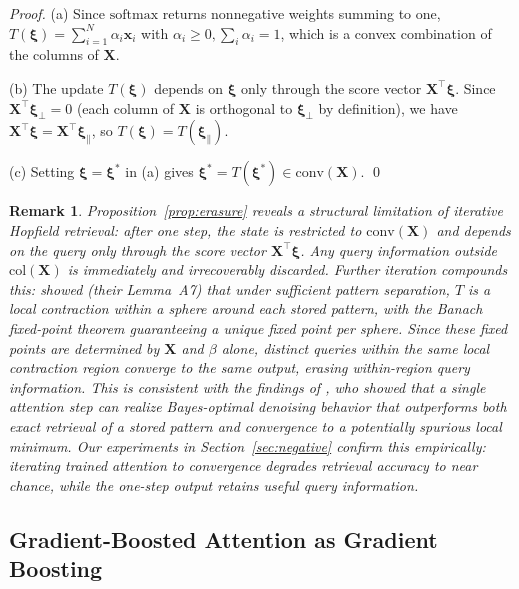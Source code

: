 \documentclass{article}
\newtheorem{remark}{Remark}
\theoremstyle{definition}
\begin{document}
\begin{proof}
(a) Since $\mathrm{softmax}$ returns nonnegative weights summing to one, $T(\boldsymbol{\xi}) = \sum_{i=1}^N \alpha_i \mathbf{x}_i$ with $\alpha_i \geq 0, \sum_i \alpha_i = 1$, which is a convex combination of the columns of $\mathbf{X}$.

(b) The update $T(\boldsymbol{\xi})$ depends on $\boldsymbol{\xi}$ only through the score vector $\mathbf{X}^\top \boldsymbol{\xi}$.
Since $\mathbf{X}^\top \boldsymbol{\xi}_\perp = 0$ (each column of $\mathbf{X}$ is orthogonal to $\boldsymbol{\xi}_\perp$ by definition), we have $\mathbf{X}^\top \boldsymbol{\xi} = \mathbf{X}^\top \boldsymbol{\xi}_\parallel$, so $T(\boldsymbol{\xi}) = T(\boldsymbol{\xi}_\parallel)$.

(c) Setting $\boldsymbol{\xi} = \boldsymbol{\xi}^*$ in (a) gives $\boldsymbol{\xi}^* = T(\boldsymbol{\xi}^*) \in \mathrm{conv}(\mathbf{X})$. \qed
\end{proof}

\begin{remark}
\label{rem:erasure}
Proposition~\ref{prop:erasure} reveals a structural limitation of iterative Hopfield retrieval: after one step, the state is restricted to $\mathrm{conv}(\mathbf{X})$ and depends on the query only through the score vector $\mathbf{X}^\top \boldsymbol{\xi}$.
Any query information outside $\mathrm{col}(\mathbf{X})$ is immediately and irrecoverably discarded.
Further iteration compounds this: \citet{ramsauer2021hopfield} showed (their Lemma~A7) that under sufficient pattern separation, $T$ is a local contraction within a sphere around each stored pattern, with the Banach fixed-point theorem guaranteeing a unique fixed point per sphere.
Since these fixed points are determined by $\mathbf{X}$ and $\beta$ alone, distinct queries within the same local contraction region converge to the same output, erasing within-region query information.
This is consistent with the findings of \citet{smart2025incontext}, who showed that a single attention step can realize Bayes-optimal denoising behavior that outperforms both exact retrieval of a stored pattern and convergence to a potentially spurious local minimum.
Our experiments in Section~\ref{sec:negative} confirm this empirically: iterating trained attention to convergence degrades retrieval accuracy to near chance, while the one-step output retains useful query information.
\end{remark}


\subsection{Gradient-Boosted Attention as Gradient Boosting}
\end{document}

